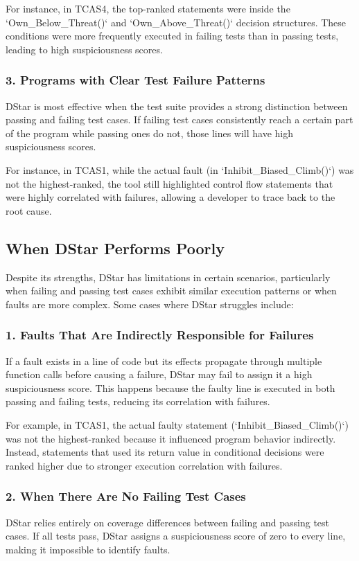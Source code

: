 \documentclass[conference]{IEEEtran}
\begin{document}
For instance, in TCAS4, the top-ranked statements were inside the `Own\_Below\_Threat()` and `Own\_Above\_Threat()` decision structures. These conditions were more frequently executed in failing tests than in passing tests, leading to high suspiciousness scores.

\subsubsection{3. Programs with Clear Test Failure Patterns}
DStar is most effective when the test suite provides a strong distinction between passing and failing test cases. If failing test cases consistently reach a certain part of the program while passing ones do not, those lines will have high suspiciousness scores. 

For instance, in TCAS1, while the actual fault (in `Inhibit\_Biased\_Climb()`) was not the highest-ranked, the tool still highlighted control flow statements that were highly correlated with failures, allowing a developer to trace back to the root cause.

\subsection{When DStar Performs Poorly}
Despite its strengths, DStar has limitations in certain scenarios, particularly when failing and passing test cases exhibit similar execution patterns or when faults are more complex. Some cases where DStar struggles include:

\subsubsection{1. Faults That Are Indirectly Responsible for Failures}
If a fault exists in a line of code but its effects propagate through multiple function calls before causing a failure, DStar may fail to assign it a high suspiciousness score. This happens because the faulty line is executed in both passing and failing tests, reducing its correlation with failures.

For example, in TCAS1, the actual faulty statement (`Inhibit\_Biased\_Climb()`) was not the highest-ranked because it influenced program behavior indirectly. Instead, statements that used its return value in conditional decisions were ranked higher due to stronger execution correlation with failures.

\subsubsection{2. When There Are No Failing Test Cases}
DStar relies entirely on coverage differences between failing and passing test cases. If all tests pass, DStar assigns a suspiciousness score of zero to every line, making it impossible to identify faults.
\end{document}
